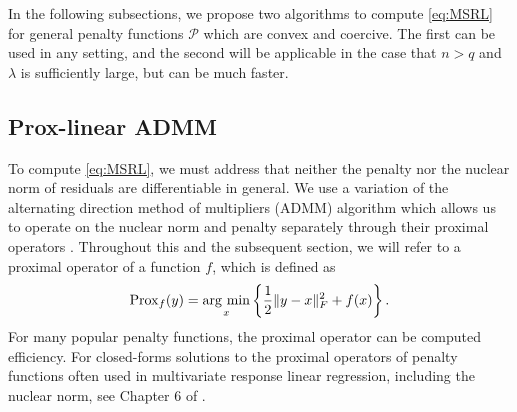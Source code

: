 \documentclass[12pt]{article}
\newcommand{\argmin}{\operatorname*{arg \ min}}
\begin{document}
In the following subsections, we propose two algorithms to compute \eqref{eq:MSRL} for general penalty functions $\mathcal{P}$ which are convex and coercive. The first can be used in any setting, and the second will be applicable in the case that $n > q$ and $\lambda$ is sufficiently large, but can be much faster. 

\subsection{Prox-linear ADMM}
To compute \eqref{eq:MSRL}, we must address that neither the penalty nor the nuclear norm of residuals are differentiable in general. We use a variation of the alternating direction method of multipliers (ADMM) algorithm which allows us to operate on the nuclear norm and penalty separately through their proximal operators \citep{parikh2014proximal}. Throughout this and the subsequent section, we will refer to a proximal operator of a function $f$, which is defined as
$$ {\rm Prox}_f(y) = \argmin_{x}\left\{ \frac{1}{2}\|y - x\|_F^2 + f(x) \right\}.$$
For many popular penalty functions, the proximal operator can be computed efficiency. For closed-forms solutions to the proximal operators of penalty functions often used in multivariate response linear regression, including the nuclear norm, see Chapter 6 of \citet{parikh2014proximal}.
\end{document}
